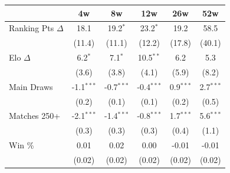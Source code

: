 \begin{tabular}{l*{5}{c}}
\toprule
 & 4w & 8w & 12w & 26w & 52w \\
\midrule
Ranking Pts $\Delta$ & 18.1 & 19.2$^{*}$ & 23.2$^{*}$ & 19.2 & 58.5 \\
 & (11.4) & (11.1) & (12.2) & (17.8) & (40.1) \\[0.3em]
Elo $\Delta$ & 6.2$^{*}$ & 7.1$^{*}$ & 10.5$^{**}$ & 6.2 & 5.3 \\
 & (3.6) & (3.8) & (4.1) & (5.9) & (8.2) \\[0.3em]
Main Draws & -1.1$^{***}$ & -0.7$^{***}$ & -0.4$^{***}$ & 0.9$^{***}$ & 2.7$^{***}$ \\
 & (0.2) & (0.1) & (0.1) & (0.2) & (0.5) \\[0.3em]
Matches 250+ & -2.1$^{***}$ & -1.4$^{***}$ & -0.8$^{***}$ & 1.7$^{***}$ & 5.6$^{***}$ \\
 & (0.3) & (0.3) & (0.3) & (0.4) & (1.1) \\[0.3em]
Win \% & 0.01 & 0.02 & 0.00 & -0.01 & -0.01 \\
 & (0.02) & (0.02) & (0.02) & (0.02) & (0.02) \\[0.3em]
\bottomrule
\end{tabular}
